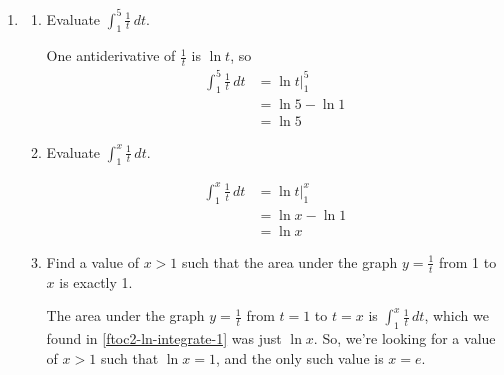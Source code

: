 \documentclass{article}
\begin{document}
\begin{enumerate}
\begin{enumerate}
  \end{enumerate}

\pspace{\newpage}

\item \label{ftoc2-ln-Mb} 

  \begin{enumerate}
  \item
    \begin{problem}
      Evaluate $\displaystyle \int_1^5 \frac{1}{t}\,dt$.
    \end{problem}
    \pspace{\vfill}

    \begin{solution}
      One antiderivative of $\frac{1}{t}$ is $\ln t$, so 
      \begin{align*}
        \int_1^5 \frac{1}{t}\,dt &= \ln t \Big|_1^5 \\
        &= \ln 5 - \ln 1 \\
        &= \boxed{\ln 5}
      \end{align*}
    \end{solution}

  \item \label{ftoc2-ln-integrate-1}
    \begin{problem}
      Evaluate $\displaystyle \int_1^x \frac{1}{t}\,dt$.
    \end{problem}
    \pspace{\vfill}

    \begin{solution}
      \begin{align*}
        \int_1^x \frac{1}{t}\,dt &= \ln t \Big|_1^x \\
        &= \ln x - \ln 1 \\
        &= \boxed{\ln x}
      \end{align*}
    \end{solution}

  \item
    \begin{problem}
      Find a value of $x > 1$ such that the area under the graph $y =
      \frac{1}{t}$ from 1 to $x$ is exactly 1.
    \end{problem}
    \pspace{\vfill}

    \begin{solution}
      The area under the graph $y = \frac{1}{t}$ from $t = 1$ to $t = x$
      is $\displaystyle \int_1^x \frac{1}{t}\,dt$, which we found in
      \ref{ftoc2-ln-integrate-1} was just $\ln x$.  So, we're looking for
      a value of $x > 1$ such that $\ln x = 1$, and the only such value is
      $\boxed{x = e}$.
    \end{solution}


\end{enumerate}
\end{enumerate}
\end{document}
